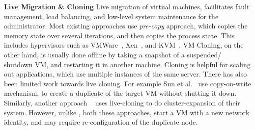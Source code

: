 \textbf{Live Migration \& Cloning}
Live migration of virtual machines, facilitates fault management, load balancing, and low-level system maintenance for the administrator.
Most existing approaches use \textit{pre-copy} approach, which copies the memory state over several iterations, and then copies the process state.
This includes hypervisors such as VMWare~\cite{nelson2005fast}, Xen~\cite{clark2005live}, and KVM~\cite{kivity2007kvm}.
VM Cloning, on the other hand, is usually done offline by taking a snapshot of a suspended/ shutdown VM, and restarting it in another machine.
Cloning is helpful for scaling out applications, which use multiple instances of the same server.
There has also been limited work towards live cloning. 
For example Sun et al.~\cite{Sun:2009:FLC:1581383.1582148} use copy-on-write mechanism, to create a duplicate of the target VM without shutting it down.
Similarly, another approach ~\cite{gebhart2009dynamic} uses live-cloning to do cluster-expansion of their system.
However, unlike \parikshan, both these approaches, start a VM with a new network identity, and may require re-configuration of the duplicate node.
  